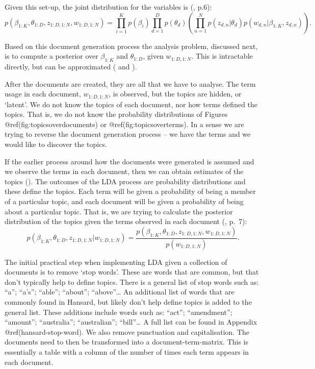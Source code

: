 \documentclass[12pt,]{article}
\begin{document}
Given this set-up, the joint distribution for the variables is
(\citet{blei2012}, p.6):
\[p(\beta_{1:K}, \theta_{1:D}, z_{1:D, 1:N}, w_{1:D, 1:N}) = \prod^{K}_{i=1}p(\beta_i) \prod^{D}_{d=1}p(\theta_d) \left(\prod^N_{n=1}p(z_{d,n}|\theta_d)p\left(w_{d,n}|\beta_{1:K},z_{d,n}\right) \right).\]

Based on this document generation process the analysis problem,
discussed next, is to compute a posterior over \(\beta_{1:K}\) and
\(\theta_{1:D}\), given \(w_{1:D, 1:N}\). This is intractable directly,
but can be approximated (\citet{GriffithsSteyvers2004} and
\citet{blei2012}).

After the documents are created, they are all that we have to analyse.
The term usage in each document, \(w_{1:D, 1:N}\), is observed, but the
topics are hidden, or `latent'. We do not know the topics of each
document, nor how terms defined the topics. That is, we do not know the
probability distributions of Figures @ref(fig:topicsoverdocuments) or
@ref(fig:topicsoverterms). In a sense we are trying to reverse the
document generation process -- we have the terms and we would like to
discover the topics.

If the earlier process around how the documents were generated is
assumed and we observe the terms in each document, then we can obtain
estimates of the topics (\citet{SteyversGriffiths2006}). The outcomes of
the LDA process are probability distributions and these define the
topics. Each term will be given a probability of being a member of a
particular topic, and each document will be given a probability of being
about a particular topic. That is, we are trying to calculate the
posterior distribution of the topics given the terms observed in each
document (\citet{blei2012}, p.~7):
\[p(\beta_{1:K}, \theta_{1:D}, z_{1:D, 1:N} | w_{1:D, 1:N}) = \frac{p\left(\beta_{1:K}, \theta_{1:D}, z_{1:D, 1:N}, w_{1:D, 1:N}\right)}{p(w_{1:D, 1:N})}.\]

The initial practical step when implementing LDA given a collection of
documents is to remove `stop words'. These are words that are common,
but that don't typically help to define topics. There is a general list
of stop words such as: ``a''; ``a's''; ``able''; ``about'';
``above''\ldots{} An additional list of words that are commonly found in
Hansard, but likely don't help define topics is added to the general
list. These additions include words such as: ``act''; ``amendment'';
``amount''; ``australia''; ``australian''; ``bill''\ldots{} A full list
can be found in Appendix @ref(hansard-stop-word). We also remove
punctuation and capitalisation. The documents need to then be
transformed into a document-term-matrix. This is essentially a table
with a column of the number of times each term appears in each document.
\end{document}
